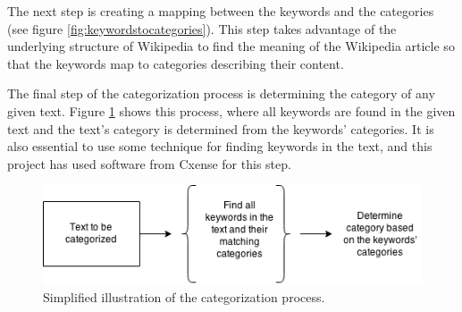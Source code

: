 The next step is creating a mapping between the keywords and the categories (see figure \ref{fig:keywordstocategories}). This step takes advantage of the underlying structure of Wikipedia to find the meaning of the Wikipedia article so that the keywords map to categories describing their content.

The final step of the categorization process is determining the category of any given text. Figure \ref{fig:categorizetext} shows this process, where all keywords are found in the given text and the text's category is determined from the keywords' categories. It is also essential to use some technique for finding keywords in the text, and this project has used software from Cxense for this step. 

\begin{figure}[h]
\centering
\includegraphics[width=\textwidth]{Chapters/Introduction/categorizetext}
\caption{Simplified illustration of the categorization process.}
\label{fig:categorizetext}
\end{figure}

